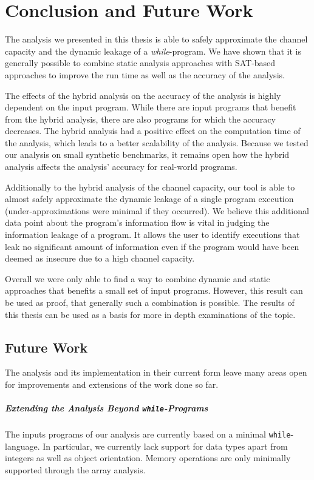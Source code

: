 \chapter{Conclusion and Future Work}\label{sec:conclusion}

The analysis we presented in this thesis is able to safely approximate the channel capacity and the dynamic leakage of a \emph{while}-program. We have shown that it is generally possible to combine static analysis approaches with SAT-based approaches to improve the run time as well as the accuracy of the analysis.

The effects of the hybrid analysis on the accuracy of the analysis is highly dependent on the input program. While there are input programs that benefit from the hybrid analysis, there are also programs for which the accuracy decreases. The hybrid analysis had a positive effect on the computation time of the analysis, which leads to a better scalability of the analysis. Because we tested our analysis on small synthetic benchmarks, it remains open how the hybrid analysis affects the analysis' accuracy for real-world programs.

Additionally to the hybrid analysis of the channel capacity, our tool is able to almost safely approximate the dynamic leakage of a single program execution (under-approximations were minimal if they occurred). We believe this additional data point about the program's information flow is vital in judging the information leakage of a program. It allows the user to identify executions that leak no significant amount of information even if the program would have been deemed as insecure due to a high channel capacity.

Overall we were only able to find a way to combine dynamic and static approaches that benefits a small set of input programs. However, this result can be used as proof, that generally such a combination is possible. The results of this thesis can be used as a basis for more in depth examinations of the topic.

\section{Future Work}
The analysis and its implementation in their current form leave many areas open for improvements and extensions of the work done so far.

\paragraph{Extending the Analysis Beyond \texttt{while}-Programs}
The inputs programs of our analysis are currently based on a minimal \texttt{while}-language. In particular, we currently lack support for data types apart from integers as well as object orientation. Memory operations are only minimally supported through the array analysis.

